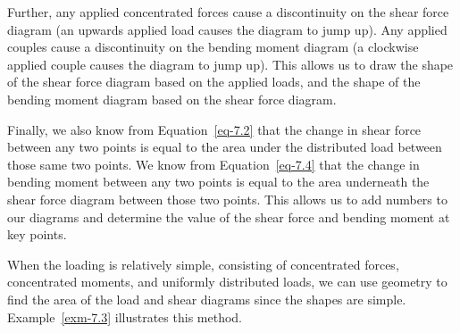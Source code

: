 \documentclass[
  letterpaper,
  DIV=11,
  numbers=noendperiod]{scrreprt}
\theoremstyle{definition}
\theoremstyle{remark}
\begin{document}
Further, any applied concentrated forces cause a discontinuity on the
shear force diagram (an upwards applied load causes the diagram to jump
up). Any applied couples cause a discontinuity on the bending moment
diagram (a clockwise applied couple causes the diagram to jump up). This
allows us to draw the shape of the shear force diagram based on the
applied loads, and the shape of the bending moment diagram based on the
shear force diagram.

Finally, we also know from Equation~\ref{eq-7.2} that the change in
shear force between any two points is equal to the area under the
distributed load between those same two points. We know from
Equation~\ref{eq-7.4} that the change in bending moment between any two
points is equal to the area underneath the shear force diagram between
those two points. This allows us to add numbers to our diagrams and
determine the value of the shear force and bending moment at key points.

When the loading is relatively simple, consisting of concentrated
forces, concentrated moments, and uniformly distributed loads, we can
use geometry to find the area of the load and shear diagrams since the
shapes are simple. Example~\ref{exm-7.3} illustrates this method.
\end{document}
